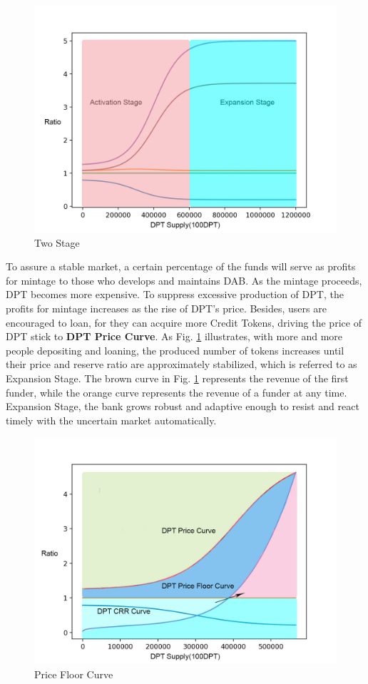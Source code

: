 \documentclass[review]{elsarticle}
\begin{document}
\begin{figure}[H]
\begin{center}
\includegraphics[width=4.5in]{Graphs/Two_Stage.jpg}
\end{center}
\caption{Two Stage}\label{TS}
\end{figure}

To assure a stable market, a certain percentage of the funds will serve as profits for mintage to those who develops and maintains DAB. As the mintage proceeds, DPT becomes more expensive. To suppress excessive production of DPT, the profits for mintage increases as the rise of DPT's price. Besides, users are encouraged to loan, for they can acquire more Credit Tokens, driving the price of DPT stick to \textbf{DPT Price Curve}. As Fig. \ref{TS} illustrates, with more and more people depositing and loaning, the produced number of tokens increases until their price and reserve ratio are approximately stabilized, which is referred to as Expansion Stage. The brown curve in Fig. \ref{TS} represents the revenue of the first funder, while the orange curve represents the revenue of a funder at any time. Expansion Stage, the bank grows robust and adaptive enough to resist and react timely with the uncertain market automatically.

\begin{figure}[H]
\begin{center}
\includegraphics[width=4.5in]{Graphs/PriceFloorCurve.jpg}
\end{center}
\caption{Price Floor Curve}\label{PFC}
\end{figure}
\end{document}
